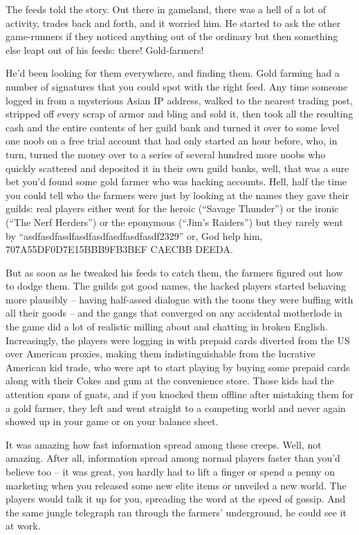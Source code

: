 The feeds told the story. Out there in gameland, there was a hell
of a lot of activity, trades back and forth, and it worried him. He
started to ask the other game-runners if they noticed anything out
of the ordinary but then something else leapt out of his feeds:
there! Gold-farmers!

He'd been looking for them everywhere, and finding them. Gold
farming had a number of signatures that you could spot with the
right feed. Any time someone logged in from a mysterious Asian IP
address, walked to the nearest trading post, stripped off every
scrap of armor and bling and sold it, then took all the resulting
cash and the entire contents of her guild bank and turned it over
to some level one noob on a free trial account that had only
started an hour before, who, in turn, turned the money over to a
series of several hundred more noobs who quickly scattered and
deposited it in their own guild banks, well, that was a sure bet
you'd found some gold farmer who was hacking accounts. Hell, half
the time you could tell who the farmers were just by looking at the
names they gave their guilds: real players either went for the
heroic (``Savage Thunder'') or the ironic (``The Nerf Herders'') or the
eponymous (``Jim's Raiders'') but they rarely went by
``asdf\-a\-sd\-f\-a\-sd\-f\-a\-s\-d\-f\-a\-sd\-f\-a\-sd\-f\-a\-sd\-f\-a\-sd\-f2329'' or, God help him,
707A\-55D\-F\-0D\-7E\-15B\-B\-B\-9F\-B3B\-E\-F%
C\-A\-E\-C\-B\-B%
D\-E\-E\-D\-A.

But as soon as he tweaked his feeds to catch them, the farmers
figured out how to dodge them. The guilds got good names, the
hacked players started behaving more plausibly -- having half-assed
dialogue with the toons they were buffing with all their goods --
and the gangs that converged on any accidental motherlode in the
game did a lot of realistic milling about and chatting in broken
English. Increasingly, the players were logging in with prepaid
cards diverted from the US over American proxies, making them
indistinguishable from the lucrative American kid trade, who were
apt to start playing by buying some prepaid cards along with their
Cokes and gum at the convenience store. Those kids had the
attention spans of gnats, and if you knocked them offline after
mistaking them for a gold farmer, they left and went straight to a
competing world and never again showed up in your game or on your
balance sheet.

It was amazing how fast information spread among these creeps.
Well, not amazing. After all, information spread among normal
players faster than you'd believe too -- it was great, you hardly
had to lift a finger or spend a penny on marketing when you
released some new elite items or unveiled a new world. The players
would talk it up for you, spreading the word at the speed of
gossip. And the same jungle telegraph ran through the farmers'
underground, he could see it at work.

